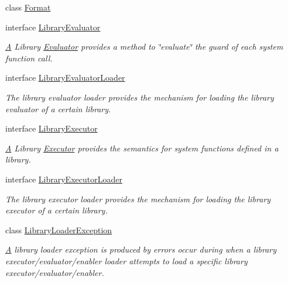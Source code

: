 \begin{DoxyCompactItemize}
class \hyperlink{classedu_1_1udel_1_1cis_1_1vsl_1_1civl_1_1semantics_1_1IF_1_1Format}{Format}
\item 
interface \hyperlink{interfaceedu_1_1udel_1_1cis_1_1vsl_1_1civl_1_1semantics_1_1IF_1_1LibraryEvaluator}{Library\+Evaluator}
\begin{DoxyCompactList}\small\item\em \hyperlink{structA}{A} Library \hyperlink{interfaceedu_1_1udel_1_1cis_1_1vsl_1_1civl_1_1semantics_1_1IF_1_1Evaluator}{Evaluator} provides a method to \char`\"{}evaluate\char`\"{} the guard of each system function call. \end{DoxyCompactList}\item 
interface \hyperlink{interfaceedu_1_1udel_1_1cis_1_1vsl_1_1civl_1_1semantics_1_1IF_1_1LibraryEvaluatorLoader}{Library\+Evaluator\+Loader}
\begin{DoxyCompactList}\small\item\em The library evaluator loader provides the mechanism for loading the library evaluator of a certain library. \end{DoxyCompactList}\item 
interface \hyperlink{interfaceedu_1_1udel_1_1cis_1_1vsl_1_1civl_1_1semantics_1_1IF_1_1LibraryExecutor}{Library\+Executor}
\begin{DoxyCompactList}\small\item\em \hyperlink{structA}{A} Library \hyperlink{interfaceedu_1_1udel_1_1cis_1_1vsl_1_1civl_1_1semantics_1_1IF_1_1Executor}{Executor} provides the semantics for system functions defined in a library. \end{DoxyCompactList}\item 
interface \hyperlink{interfaceedu_1_1udel_1_1cis_1_1vsl_1_1civl_1_1semantics_1_1IF_1_1LibraryExecutorLoader}{Library\+Executor\+Loader}
\begin{DoxyCompactList}\small\item\em The library executor loader provides the mechanism for loading the library executor of a certain library. \end{DoxyCompactList}\item 
class \hyperlink{classedu_1_1udel_1_1cis_1_1vsl_1_1civl_1_1semantics_1_1IF_1_1LibraryLoaderException}{Library\+Loader\+Exception}
\begin{DoxyCompactList}\small\item\em \hyperlink{structA}{A} library loader exception is produced by errors occur during when a library executor/evaluator/enabler loader attempts to load a specific library executor/evaluator/enabler. \end{DoxyCompactList}\item 

\end{DoxyCompactItemize}
